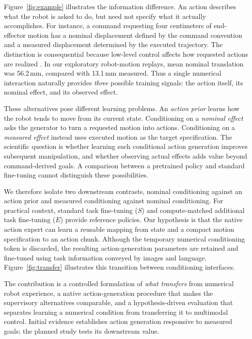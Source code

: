 \documentclass[conference]{IEEEtran}
\begin{document}
Figure~\ref{fig:example} illustrates the information difference. An action describes what the robot is asked to do, but need not specify what it actually accomplishes. For instance, a command requesting four centimeters of end-effector motion has a nominal displacement defined by the command convention and a measured displacement determined by the executed trajectory. The distinction is consequential because low-level control affects how requested actions are realized \citep{bronars2026tune}. In our exploratory robot-motion replays, mean nominal translation was 56.2\,mm, compared with 13.1\,mm measured. Thus a single numerical interaction naturally provides \emph{three} possible training signals: the action itself, its nominal effect, and its observed effect.

These alternatives pose different learning problems. An \emph{action prior} learns how the robot tends to move from its current state. Conditioning on a \emph{nominal effect} asks the generator to turn a requested motion into actions. Conditioning on a \emph{measured effect} instead uses executed motion as the target specification. The scientific question is whether learning such conditional action generation improves subsequent manipulation, and whether observing actual effects adds value beyond command-derived goals. A comparison between a pretrained policy and standard fine-tuning cannot distinguish these possibilities.

We therefore isolate two downstream contrasts, nominal conditioning against an action prior and measured conditioning against nominal conditioning. For practical context, standard task fine-tuning ($S$) and compute-matched additional task fine-tuning ($E$) provide reference policies. Our hypothesis is that the native action expert can learn a reusable mapping from state and a compact motion specification to an action chunk. Although the temporary numerical conditioning token is discarded, the resulting action-generation parameters are retained and fine-tuned using task information conveyed by images and language. Figure~\ref{fig:transfer} illustrates this transition between conditioning interfaces.

The contribution is a controlled formulation of \emph{what transfers} from numerical robot experience, a native action-generation procedure that makes the supervisory alternatives comparable, and a hypothesis-driven evaluation that separates learning a numerical condition from transferring it to multimodal control. Initial evidence establishes action generation responsive to measured goals; the planned study tests its downstream value.
\end{document}
